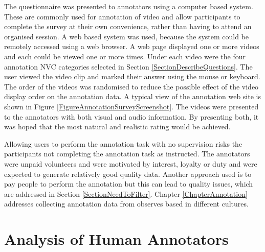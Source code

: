 The questionnaire was presented to annotators using a computer based system. These are commonly used for annotation of video \cite{Eckhardt2009, Cowie2000, Tarasov2010} and allow participants to complete the survey at their own convenience, rather than having to attend an organised session. A web based system was used, because the system could be remotely accessed using a web browser. A web page displayed one or more videos and each could be viewed one or more times. Under each video were the four annotation \ac{NVC} categories selected in Section \ref{SectionDescribeQuestions}. The user viewed the video clip and marked their answer using the mouse or keyboard. The order of the videos was randomised to reduce the possible effect of the video display order on the annotation data. A typical view of the annotation web site is shown in Figure \ref{FigureAnnotationSurveyScreenshot}. The videos were presented to the annotators with both visual and audio information. By presenting both, it was hoped that the most natural and realistic rating would be achieved. 

Allowing users to perform the annotation task with no supervision risks the participants not completing the annotation task as instructed.
The annotators were unpaid volunteers and were motivated by interest, loyalty or duty and were expected to generate relatively good quality data. Another approach used is to pay people to perform the annotation but this can lead to quality issues, which are addressed in Section \ref{SectionNeedToFilter}. Chapter \ref{ChapterAnnotation} addresses collecting annotation data from observes based in different cultures.


\section{Analysis of Human Annotators}
\label{SectionAnalysisOfHumanAnnotation}


